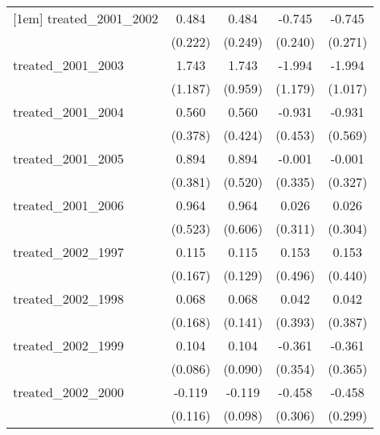 {\begin{tabular}{l*{4}{c}}
[1em]
treated\_2001\_2002&       0.484\sym{*}  &       0.484         &      -0.745\sym{**} &      -0.745\sym{**} \\
            &     (0.222)         &     (0.249)         &     (0.240)         &     (0.271)         \\
[1em]
treated\_2001\_2003&       1.743         &       1.743         &      -1.994         &      -1.994         \\
            &     (1.187)         &     (0.959)         &     (1.179)         &     (1.017)         \\
[1em]
treated\_2001\_2004&       0.560         &       0.560         &      -0.931\sym{*}  &      -0.931         \\
            &     (0.378)         &     (0.424)         &     (0.453)         &     (0.569)         \\
[1em]
treated\_2001\_2005&       0.894\sym{*}  &       0.894         &      -0.001         &      -0.001         \\
            &     (0.381)         &     (0.520)         &     (0.335)         &     (0.327)         \\
[1em]
treated\_2001\_2006&       0.964         &       0.964         &       0.026         &       0.026         \\
            &     (0.523)         &     (0.606)         &     (0.311)         &     (0.304)         \\
[1em]
treated\_2002\_1997&       0.115         &       0.115         &       0.153         &       0.153         \\
            &     (0.167)         &     (0.129)         &     (0.496)         &     (0.440)         \\
[1em]
treated\_2002\_1998&       0.068         &       0.068         &       0.042         &       0.042         \\
            &     (0.168)         &     (0.141)         &     (0.393)         &     (0.387)         \\
[1em]
treated\_2002\_1999&       0.104         &       0.104         &      -0.361         &      -0.361         \\
            &     (0.086)         &     (0.090)         &     (0.354)         &     (0.365)         \\
[1em]
treated\_2002\_2000&      -0.119         &      -0.119         &      -0.458         &      -0.458         \\
            &     (0.116)         &     (0.098)         &     (0.306)         &     (0.299)         \\

\end{tabular}}
